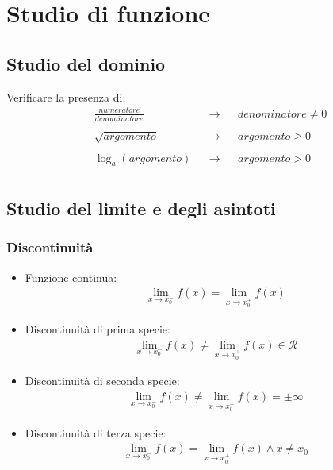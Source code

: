 \documentclass[a4paper]{article}
\begin{document}
	
	
	\newpage
	\section{Studio di funzione}
		\subsection{Studio del dominio}
		Verificare la presenza di:\\
		\begin{align*}
			&\frac{numeratore}{denominatore} & &\to & &denominatore \ne 0\\\\
			&\sqrt{argomento}				 & &\to & &argomento \ge 0\\\\
			&\log_{a}{(argomento)}			 & &\to & &argomento > 0\\
		\end{align*}
		
		\subsection{Studio del limite e degli asintoti}
		\subsubsection{Discontinuità}
		\begin{itemize}
			\item  Funzione continua:
			\begin{align*}
			\lim\limits_{x \to x_0^-} f(x) = \lim\limits_{x \to x_0^+} f(x)
			\end{align*}
			\item  Discontinuità di prima specie:
			\begin{align*}
			\lim\limits_{x \to x_0^-} f(x) \ne \lim\limits_{x \to x_0^+} f(x) \in \mathcal{R}
			\end{align*}
			\item  Discontinuità di seconda specie:
			\begin{align*}
			\lim\limits_{x \to x_0^-} f(x) \ne \lim\limits_{x \to x_0^+} f(x) = \pm \infty
			\end{align*}
			\item Discontinuità di terza specie:
			\begin{align*}
			\lim\limits_{x \to x_0^-} f(x) = \lim\limits_{x \to x_0^+} f(x) \wedge x \ne x_0
			\end{align*}
			
		\end{itemize}
		
\end{document}
